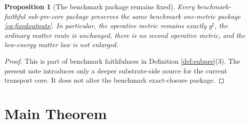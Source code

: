 \documentclass[11pt]{article}
\newcommand{\CompletedMetric}{g^{\sharp}}
\newtheorem{proposition}{Proposition}
\begin{document}
\begin{proposition}[The benchmark package remains fixed]
\label{prop:benchmark}
Every benchmark-faithful sub-pre-core package preserves the same benchmark one-metric package \eqref{eq:fixedoutputs}. In particular, the operative metric remains exactly \(\CompletedMetric\), the ordinary matter route is unchanged, there is no second operative metric, and the low-energy matter law is not enlarged.
\end{proposition}

\begin{proof}
This is part of benchmark faithfulness in Definition \ref{def:subpre}(3). The present note introduces only a deeper substrate-side source for the current transport core. It does not alter the benchmark exact-closure package.
\end{proof}

\section{Main Theorem}
\end{document}

